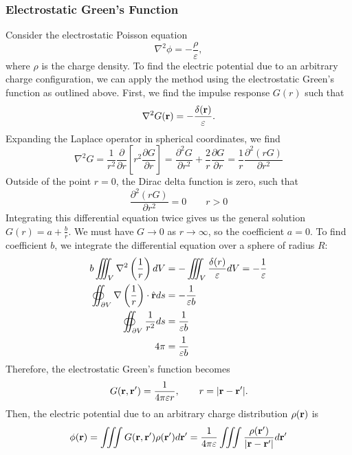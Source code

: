 \subsubsection{Electrostatic Green's Function}
Consider the electrostatic Poisson equation
\begin{equation}
	\nabla^2 \phi = -\frac{\rho}{\varepsilon},
\end{equation}
where $\rho$ is the charge density. To find the electric potential due to an arbitrary charge configuration, we can apply the method using the electrostatic Green's function as outlined above. First, we find the impulse response $G(r)$ such that
\begin{equation}
	\nabla^2 G(\mathbf{r}) = -\frac{\delta(\mathbf{r})}{\varepsilon}.
\end{equation}
Expanding the Laplace operator in spherical coordinates, we find
\begin{equation*}
	\nabla^2 G = \frac{1}{r^2} \frac{\partial}{\partial r} \left[ r^2 \frac
	{\partial G}{\partial r} \right] = \frac{\partial^2 G}{\partial r^2} + \frac{2}{r} \frac{\partial G}{\partial r} = \frac{1}{r} \frac{\partial^2 (r G)}{\partial r^2}
\end{equation*}
Outside of the point $r = 0$, the Dirac delta function is zero, such that
\begin{equation}
	\frac{\partial^2 (r G)}{\partial r^2} = 0 \qquad r > 0
\end{equation}
Integrating this differential equation twice gives us the general solution $G(r) = a + \frac{b}{r}$. We must have $G \to 0$ as $r \to \infty$, so the coefficient $a = 0$. To find coefficient $b$, we integrate the differential equation over a sphere of radius $R$:
\begin{align*}
	b \iiint_{V} \nabla^2 \left( \frac{1}{r} \right) dV & = - \iiint_V \frac{\delta(r)}{\varepsilon} dV = -\frac{1}{\varepsilon} \\
	\oiint_{\partial V} \nabla \left( \frac{1}{r} \right) \cdot \hat{\mathbf{r}} ds & = -\frac{1}{\varepsilon b} \\
	\oiint_{\partial V} \frac{1}{r^2} ds & = \frac{1}{\varepsilon b} \\
	4\pi & = \frac{1}{\varepsilon b}
\end{align*}
Therefore, the electrostatic Green's function becomes
\begin{equation}
	G(\mathbf{r}, \mathbf{r}^\prime) = \frac{1}{4\pi \varepsilon r}, \qquad r = |\mathbf{r} - \mathbf{r}^\prime|.
\end{equation}
Then, the electric potential due to an arbitrary charge distribution $\rho(\mathbf{r})$ is 
\begin{equation}
	\phi(\mathbf{r}) = \iiint G(\mathbf{r}, \mathbf{r}^\prime) \rho(\mathbf{r}^\prime) d\mathbf{r}^\prime = \frac{1}{4\pi\varepsilon} \iiint \frac{\rho(\mathbf{r}^\prime)}{|\mathbf{r} - \mathbf{r}^\prime|} d\mathbf{r}^\prime
\end{equation}

